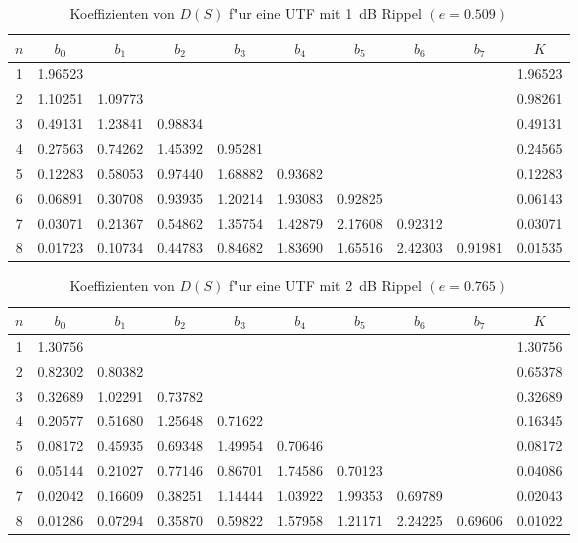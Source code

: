 \begin{table}[!htb]
\begin{center}
{\footnotesize
\begin{tabular}{|c||c|c|c|c|c|c|c|c||c|}\hline
$n$ & $b_0$ & $b_1$ & $b_2$ & $b_3$ & $b_4$ & $b_5$ & $b_6$ & $b_7$ & $K$\\ \hline\hline
 1 & 1.96523 & & & & & & & & 1.96523   \\ \hline
 2 & 1.10251 & 1.09773 & & & & & & & 0.98261 \\ \hline
 3 & 0.49131 & 1.23841 & 0.98834 & & & & & & 0.49131  \\ \hline
 4 & 0.27563 & 0.74262 & 1.45392 & 0.95281 & & & & & 0.24565 \\ \hline
 5 & 0.12283 & 0.58053 & 0.97440 & 1.68882 & 0.93682 & & & & 0.12283  \\ \hline
 6 & 0.06891 & 0.30708 & 0.93935 & 1.20214 & 1.93083 & 0.92825 & & & 0.06143  \\ \hline   
 7 & 0.03071 & 0.21367 & 0.54862 & 1.35754 & 1.42879 & 2.17608 & 0.92312 & & 0.03071 \\ \hline   
 8 & 0.01723 & 0.10734 & 0.44783 & 0.84682 & 1.83690 & 1.65516 & 2.42303 & 0.91981 & 0.01535 \\ \hline
\end{tabular}\vspace*{-1mm}\caption{Koeffizienten von $D(S)$ f"ur eine UTF mit 1~dB Rippel $(e=0.509)$} \label{koef-1}
}
\end{center}
\vspace*{-4mm}
\end{table}

\begin{table}[!htb]
\begin{center}
{\footnotesize
\begin{tabular}{|c||c|c|c|c|c|c|c|c||c|}\hline
$n$ & $b_0$ & $b_1$ & $b_2$ & $b_3$ & $b_4$ & $b_5$ & $b_6$ & $b_7$ & $K$\\ \hline\hline
 1 & 1.30756 & & & & & & & & 1.30756   \\ \hline
 2 & 0.82302 & 0.80382 & & & & & & & 0.65378 \\ \hline
 3 & 0.32689 & 1.02291 & 0.73782 & & & & & & 0.32689  \\ \hline
 4 & 0.20577 & 0.51680 & 1.25648 & 0.71622 & & & & & 0.16345 \\ \hline
 5 & 0.08172 & 0.45935 & 0.69348 & 1.49954 & 0.70646 & & & & 0.08172  \\ \hline
 6 & 0.05144 & 0.21027 & 0.77146 & 0.86701 & 1.74586 & 0.70123 & & & 0.04086  \\ \hline   
 7 & 0.02042 & 0.16609 & 0.38251 & 1.14444 & 1.03922 & 1.99353 & 0.69789 & & 0.02043 \\ \hline   
 8 & 0.01286 & 0.07294 & 0.35870 & 0.59822 & 1.57958 & 1.21171 & 2.24225 & 0.69606 & 0.01022 \\ \hline
\end{tabular}\vspace*{-1mm}\caption{Koeffizienten von $D(S)$ f"ur eine UTF mit 2~dB Rippel $(e=0.765)$}\label{koef-2}
}
\end{center}
\vspace*{-6mm}
\end{table}


